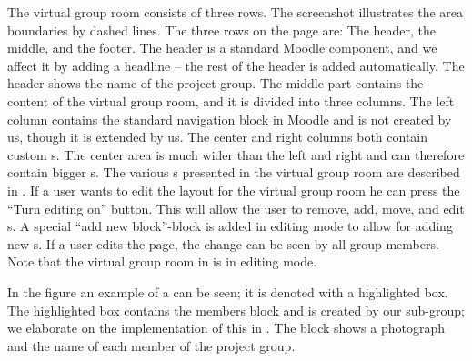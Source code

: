 The virtual group room consists of three rows.
The screenshot illustrates the area boundaries by dashed lines. 
The three rows on the page are: The header, the middle, and the footer. 
The header is a standard Moodle component, and we affect it by adding a headline -- the rest of the header is added automatically.
The header shows the name of the project group. 
The middle part contains the content of the virtual group room, and it is divided into three columns. 
The left column contains the standard navigation block in Moodle and is not created by us, though it is extended by us.
The center and right columns both contain custom \block{}s.
The center area is much wider than the left and right and can therefore contain bigger \block{}s. 
The various \block{}s presented in the virtual group room are described in . 
If a user wants to edit the layout for the virtual group room he can press the ``Turn editing on'' button. 
This will allow the user to remove, add, move, and edit \block{}s. 
A special ``add new block''-block is added in editing mode to allow for adding new \block{}s. 
If a user edits the page, the change can be seen by all group members. 
Note that the virtual group room in  is in editing mode.

In the figure an example of a \block{} can be seen; it is denoted with a highlighted box.
The highlighted box contains the members block and is created by our sub-group; we elaborate on the implementation of this in . 
The block shows a photograph and the name of each member of the project group. 



